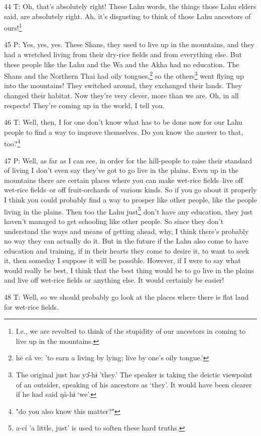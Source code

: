 44 T: Oh, that's absolutely right! These Lahu words, the things those Lahu elders
said, are absolutely right. Ah, it's disgusting to think of those Lahu ancestors
of ours!\footnote{I.e., we are revolted to think of the stupidity of our ancestors in coming to live up in the mountains.}

45 P: Yes, yes, yes. These Shans, they used to live up in the mountains, and they
had a wretched living from their dry-rice fields and from everything else. But
these people like the Lahu and the Wa and the Akha had no education. The Shans
and the Northern Thai had oily tongues,\footnote{hē câ ve: 'to earn a living by lying; live by one's oily tongue.'} so the others\footnote{The original just has yɔ̂-hɨ 'they.' The speaker is taking the deictic viewpoint of an outsider, speaking of his ancestors as `they'. It would have been clearer if he had said ŋà-hɨ `we'.} went flying up into
the mountains! They switched around, they exchanged their lands. They changed their
habitat. Now they're very clever, more than we are. Oh, in all respects! They're
coming up in the world, I tell you.

46 T: Well, then, I for one don't know what has to be done now for our Lahu people
to find a way to improve themselves. Do you know the answer to that, too?\footnote{"do you also know this matter?"}

47 P: Well, as far as I can see, in order for the hill-people to raise their standard
of living I don't even say they've got to go live in the plains. Even up in the
mountains there are certain places where you can make wet-rice fields--live off
wet-rice fields--or off fruit-orchards of various kinds. So if you go about it
properly I think you could probably find a way to prosper like other people, like
the people living in the plains. Then too the Lahu just\footnote{a-cí 'a little, just' is used to soften these hard truths.} don't have any education,
they just haven't managed to get schooling like other people. So since they don't
understand the ways and means of getting ahead, why, I think there's probably no
way they can actually do it. But in the future if the Lahu also come to have education
and training, if in their hearts they come to desire it, to want to seek it, then
someday I suppose it will be possible. However, if I were to say what would really
be best, I think that the best thing would be to go live in the plains and live
off wet-rice fields or anything else. It would certainly be easier!

48 T: Well, so we should probably go look at the places where there is flat land
for wet-rice fields.

